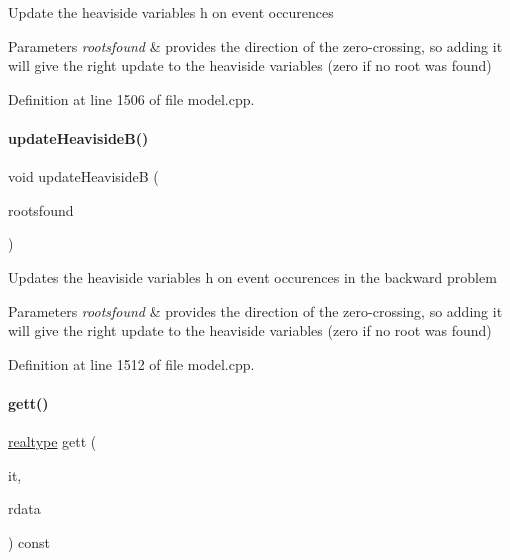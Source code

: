 Update the heaviside variables h on event occurences


\begin{DoxyParams}{Parameters}
{\em rootsfound} & provides the direction of the zero-\/crossing, so adding it will give the right update to the heaviside variables (zero if no root was found) \\
\hline
\end{DoxyParams}


Definition at line 1506 of file model.\+cpp.

\mbox{\label{classamici_1_1_model_a430edd546832d0abbea6472eb7e43da8}} 
\paragraph{\texorpdfstring{updateHeavisideB()}{updateHeavisideB()}}
{\footnotesize\ttfamily void update\+HeavisideB (\begin{DoxyParamCaption}\item[{const int $\ast$}]{rootsfound }\end{DoxyParamCaption})}

Updates the heaviside variables h on event occurences in the backward problem 
\begin{DoxyParams}{Parameters}
{\em rootsfound} & provides the direction of the zero-\/crossing, so adding it will give the right update to the heaviside variables (zero if no root was found) \\
\hline
\end{DoxyParams}


Definition at line 1512 of file model.\+cpp.

\mbox{\label{classamici_1_1_model_a09e0a747a99fb59657e71690ce69726b}} 
\paragraph{\texorpdfstring{gett()}{gett()}}
{\footnotesize\ttfamily \mbox{\hyperlink{namespaceamici_a1bdce28051d6a53868f7ccbf5f2c14a3}{realtype}} gett (\begin{DoxyParamCaption}\item[{const int}]{it,  }\item[{const \mbox{\hyperlink{classamici_1_1_return_data}{Return\+Data}} $\ast$}]{rdata }\end{DoxyParamCaption}) const}

